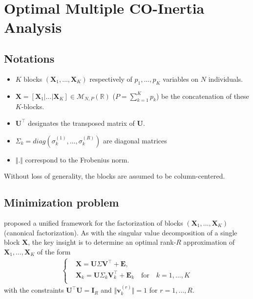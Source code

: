 \documentclass[11pt]{article}
\newcommand{\X}{\textbf{X}}
\newcommand{\U}{\textbf{U}}
\newcommand{\V}{\textbf{V}}
\renewcommand{\v}{\textbf{v}}
\begin{document}


\section{Optimal Multiple CO-Inertia Analysis}

\subsection*{Notations}

\begin{itemize}
	\item $K$ blocks  $(\textbf{X}_1,\ldots,\textbf{X}_K)$ respectively of $p_1,\ldots,p_K$ variables on $N$ individuals.
	\item  $\textbf{X}=[\textbf{X}_1|\ldots|\textbf{X}_K]\in \mathcal M_{N,P}(\mathbb R)$ ($P=\sum_{k=1}^K p_k$) be the concatenation of these $K$-blocks.
	\item $\textbf{U}^\intercal$ designates the transposed matrix of $\textbf{U}$. 
	\item $\Sigma_k=diag(\sigma_k^{(1)},...,\sigma_k^{(R)})$ are diagonal matrices 
	\item $\Vert . \Vert$ correspond to the Frobenius norm.
\end{itemize}
 Without loss of generality, the blocks are assumed to be column-centered.

\subsection{Minimization problem}
\cite{Bougeard024} proposed a unified framework for the factorization of blocks 
$(\X_1,\ldots,\X_K)$ (canonical factorization). As with the singular value 
decomposition of a single block $\X$, the key insight is to determine an optimal 
rank-$R$ approximation of $\X_1,\ldots,\X_K$ of the form
\begin{align}
  \left\{
    \begin{array}{ll}
        &\X  = \U \Sigma \V^\intercal +\textbf{E},   \\
        &\X_k = \U \Sigma_k \V_k^\intercal +\textbf{E}_k 
        \quad \text{for} \quad k=1, \dots, K   \label{Eqn_Facto2} \\	 
    \end{array}
  \right.
\end{align}
with the constraints $\U^\intercal\U=\textbf{I}_R$ and $\Vert\v_k^{(r)}\Vert=1$ for $r=1, \dots, R$.
\end{document}
